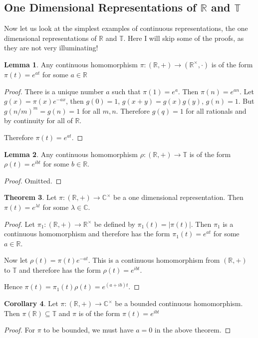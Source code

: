 \documentclass[12pt, a4paper]{article}
\theoremstyle{definition}
\newtheorem{theorem}{Theorem}[section]
\newtheorem{lemma}[theorem]{Lemma}
\newtheorem{corollary}[theorem]{Corollary}
\begin{document}
\subsection{One Dimensional Representations of $\mathbb{R}$ and $\mathbb{T}$}

Now let us look at the simplest examples of continuous representations, the one dimensional representations of $\mathbb{R}$ and $\mathbb{T}$. Here I will skip some of the proofs, as they are not very illuminating!

\begin{lemma}
Any continuous homomorphism $\pi : (\mathbb{R}, +) \to (\mathbb{R}^\times, \cdot)$ is of the form $\pi(t) = e^{at}$ for some $a \in \mathbb{R}$
\end{lemma}
\begin{proof}
There is a unique number $a$ such that $\pi(1) = e^a$. Then $\pi(n) = e^{an}$. Let $g(x) = \pi(x)e^{-ax}$, then $g(0) = 1$, $g(x + y) = g(x)g(y)$, $g(n)=1$. But $g(n/m)^m = g(n) = 1$ for all $m, n$. Therefore $g(q) = 1$ for all rationals and by continuity for all of $\mathbb{R}$.

Therefore $\pi(t) = e^{at}$.
\end{proof}

\begin{lemma}
Any continuous homomorphism $\rho : (\mathbb{R}, +) \to \mathbb{T}$ is of the form $\rho(t) = e^{ibt}$ for some $b \in \mathbb{R}$.
\end{lemma}
\begin{proof}
Omitted.
\end{proof}

\begin{theorem}
Let $\pi : (\mathbb{R}, +) \to \mathbb{C}^\times$ be a one dimensional representation. Then $\pi(t) = e^{\lambda t}$ for some $\lambda \in \mathbb{C}$.
\end{theorem}
\begin{proof}
Let $\pi_1 : (\mathbb{R}, +) \to \mathbb{R}^\times$ be defined by $\pi_1(t) = |\pi(t)|$. Then $\pi_1$ is a continuous homomorphism and therefore has the form $\pi_1(t) = e^{at}$ for some $a \in \mathbb{R}$.

Now let $\rho(t) = \pi(t) e^{-at}$. This is a continuous homomorphism from $(\mathbb{R}, +)$ to $\mathbb{T}$ and therefore has the form $\rho(t) = e^{ibt}$.

Hence $\pi(t) = \pi_1(t) \rho(t) = e^{(a+ib)t}$.
\end{proof}

\begin{corollary}
Let $\pi : (\mathbb{R}, +) \to \mathbb{C}^\times$ be a bounded continuous homomorphism. Then $\pi(\mathbb{R}) \subseteq \mathbb{T}$ and $\pi$ is of the form $\pi(t) = e^{ibt}$
\end{corollary}
\begin{proof}
For $\pi$ to be bounded, we must have $a = 0$ in the above theorem.
\end{proof}
\end{document}

